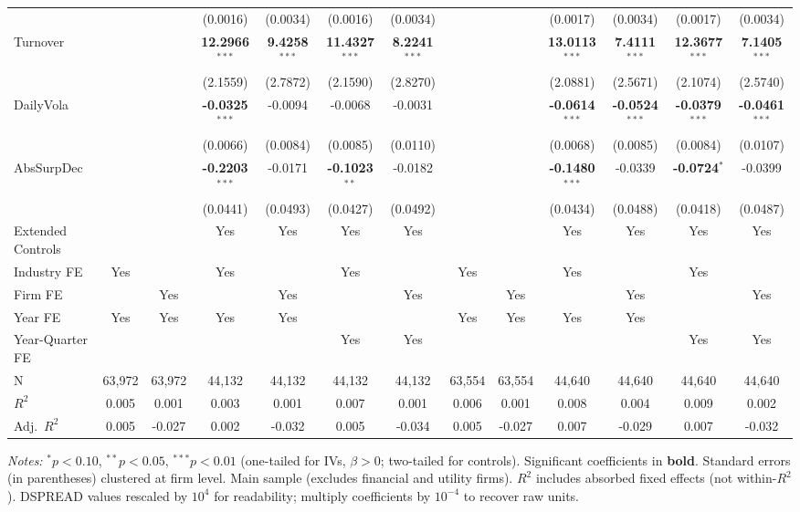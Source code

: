 \begin{landscape}
\begin{table}[H]
\begin{tabular}{lcccccccccccc}
 &  &  & (0.0016) & (0.0034) & (0.0016) & (0.0034) &  &  & (0.0017) & (0.0034) & (0.0017) & (0.0034) \\
Turnover &  &  & \textbf{12.2966}$^{***}$ & \textbf{9.4258}$^{***}$ & \textbf{11.4327}$^{***}$ & \textbf{8.2241}$^{***}$ &  &  & \textbf{13.0113}$^{***}$ & \textbf{7.4111}$^{***}$ & \textbf{12.3677}$^{***}$ & \textbf{7.1405}$^{***}$ \\
 &  &  & (2.1559) & (2.7872) & (2.1590) & (2.8270) &  &  & (2.0881) & (2.5671) & (2.1074) & (2.5740) \\
DailyVola &  &  & \textbf{-0.0325}$^{***}$ & -0.0094 & -0.0068 & -0.0031 &  &  & \textbf{-0.0614}$^{***}$ & \textbf{-0.0524}$^{***}$ & \textbf{-0.0379}$^{***}$ & \textbf{-0.0461}$^{***}$ \\
 &  &  & (0.0066) & (0.0084) & (0.0085) & (0.0110) &  &  & (0.0068) & (0.0085) & (0.0084) & (0.0107) \\
AbsSurpDec &  &  & \textbf{-0.2203}$^{***}$ & -0.0171 & \textbf{-0.1023}$^{**}$ & -0.0182 &  &  & \textbf{-0.1480}$^{***}$ & -0.0339 & \textbf{-0.0724}$^{*}$ & -0.0399 \\
 &  &  & (0.0441) & (0.0493) & (0.0427) & (0.0492) &  &  & (0.0434) & (0.0488) & (0.0418) & (0.0487) \\
\midrule
Extended Controls &  &  & Yes & Yes & Yes & Yes &  &  & Yes & Yes & Yes & Yes \\
Industry FE & Yes &  & Yes &  & Yes &  & Yes &  & Yes &  & Yes &  \\
Firm FE &  & Yes &  & Yes &  & Yes &  & Yes &  & Yes &  & Yes \\
Year FE & Yes & Yes & Yes & Yes &  &  & Yes & Yes & Yes & Yes &  &  \\
Year-Quarter FE &  &  &  &  & Yes & Yes &  &  &  &  & Yes & Yes \\
\midrule
N & 63,972 & 63,972 & 44,132 & 44,132 & 44,132 & 44,132 & 63,554 & 63,554 & 44,640 & 44,640 & 44,640 & 44,640 \\
$R^2$ & 0.005 & 0.001 & 0.003 & 0.001 & 0.007 & 0.001 & 0.006 & 0.001 & 0.008 & 0.004 & 0.009 & 0.002 \\
Adj.~$R^2$ & 0.005 & -0.027 & 0.002 & -0.032 & 0.005 & -0.034 & 0.005 & -0.027 & 0.007 & -0.029 & 0.007 & -0.032 \\
\bottomrule
\end{tabular}
\begin{minipage}{\linewidth}
\vspace{2pt}\scriptsize
\textit{Notes:} $^{*}p<0.10$, $^{**}p<0.05$, $^{***}p<0.01$ (one-tailed for IVs, $\beta > 0$; two-tailed for controls).
 Significant coefficients in \textbf{bold}.
 Standard errors (in parentheses) clustered at firm level.
 Main sample (excludes financial and utility firms).
 $R^2$ includes absorbed fixed effects (not within-$R^2$).
 DSPREAD values rescaled by $10^4$ for readability; multiply coefficients by $10^{-4}$ to recover raw units.
\end{minipage}
\end{table}
\end{landscape}